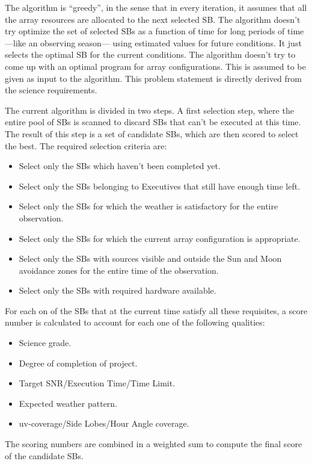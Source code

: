The algorithm is ``greedy'', in the sense that in every iteration, it assumes that all the array resources are allocated to the next selected SB. The algorithm doesn't try optimize the set of selected SBs as a function of time for long periods of time ---like an observing season--- using estimated values for future conditions. It just selects the optimal SB for the current conditions. The algorithm doesn't try to come up with an optimal program for array configurations. This is assumed to be given as input to the algorithm. This problem statement is directly derived from the science requirements.

The current algorithm is divided in two steps. A first selection step, where the entire pool of SBs is scanned to discard SBs that can't be executed at this time. The result of this step is a set of candidate SBs, which are then scored to select the best. The required selection criteria are:
\begin{itemize}
\item Select only the SBs which haven't been completed yet.
\item Select only the SBs belonging to Executives that still have enough time left.
\item Select only the SBs for which the weather is satisfactory for the entire observation.
\item Select only the SBs for which the current array configuration is appropriate.
\item Select only the SBs with sources visible and outside the Sun and Moon avoidance zones for the entire time of the observation.
\item Select only the SBs with required hardware available.
\end{itemize}

For each on of the SBs that at the current time satisfy all these requisites, a score number is calculated to account for each one of the following qualities:
\begin{itemize}
\item Science grade.
\item Degree of completion of project.
\item Target SNR/Execution Time/Time Limit.
\item Expected weather pattern.
\item uv-coverage/Side Lobes/Hour Angle coverage.
\end{itemize}
The scoring numbers are combined in a weighted sum to compute the final score of the
candidate SBs.


